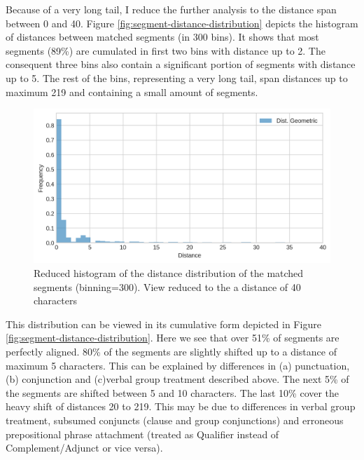 
    Because of a very long tail, I reduce the further analysis to the distance span between 0 and 40. Figure \ref{fig:segment-distance-distribution} depicts the histogram of distances between matched segments (in 300 bins). It shows that most segments (89\%) are cumulated in first two bins with distance up to 2. The consequent three bins also contain a significant portion of segments with distance up to 5. The rest of the bins, representing a very long tail, span distances up to maximum 219 and containing a small amount of segments. 

    \begin{figure}[!ht]
        \centering
        \includegraphics[width=.65\textwidth]{evaluation-results/figures/distance-distr-histogram}
        \caption{Reduced histogram of the distance distribution of the matched segments (binning=300). View reduced to the a distance of 40 characters}
        \label{fig:segment-distance-histogram}
    \end{figure}

    This distribution can be viewed in its cumulative form depicted in Figure \ref{fig:segment-distance-distribution}. Here we see that over 51\% of segments are perfectly aligned. 80\% of the segments are slightly shifted up to a distance of maximum 5 characters. This can be explained by differences in (a) punctuation, (b) conjunction and (c)verbal group treatment described above. The next 5\% of the segments are shifted between 5 and 10 characters. The last 10\% cover the heavy shift of distances 20 to 219. This may be due to differences in verbal group treatment, subsumed conjuncts (clause and group conjunctions) and erroneous prepositional phrase attachment (treated as Qualifier instead of Complement/Adjunct or vice versa). 


